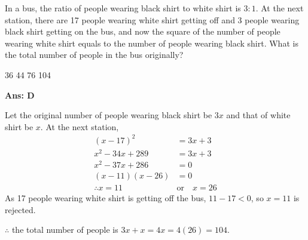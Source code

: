 \documentclass[varwidth=70mm]{standalone}
\begin{document}
In a bus, the ratio of people wearing black shirt to white shirt is $3:1$. At the next station, there are 17 people wearing white shirt getting off and 3 people wearing black shirt getting on the bus, and now the square of the number of people wearing white shirt equals to the number of people wearing black shirt. What is the total number of people in the bus originally? 

\begin{choices}
\choice \num{36}
\choice \num{44}
\choice \num{76}
\choice \num{104}%
\end{choices}

\begin{answer}
\hrulefill\par
\textbf{Ans: D}

Let the original number of people wearing black shirt be $3x$ and that of white shirt be $x$. At the next station,
\begin{equation*}
\begin{aligned}
(x - 17)^2 &= 3x + 3 \\
x^2 - 34x + 289 &= 3x + 3 \\
x^2 - 37x + 286 &= 0 \\
(x-11)(x-26) &= 0 \\
\therefore x = 11 \quad&\text{or}\quad x = 26
\end{aligned}
\end{equation*}
As 17 people wearing white shirt is getting off the bus, $11-17 < 0$, so $x=11$ is rejected.

$\therefore$ the total number of people is $3x+x = 4x = 4(26) = 104$.

\end{answer}
\end{document}
